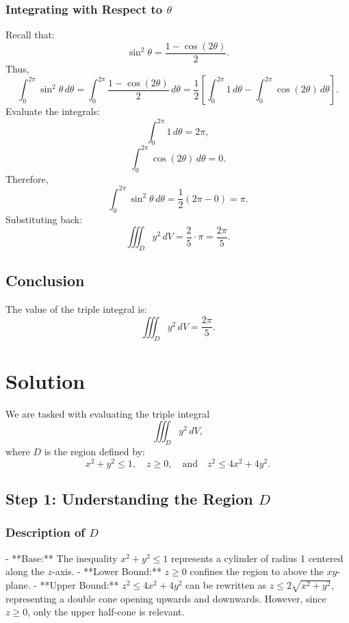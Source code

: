 \documentclass[11pt]{article}
\begin{document}
\subsubsection{Integrating with Respect to \( \theta \)}
Recall that:
\[
\sin^2\theta = \frac{1 - \cos(2\theta)}{2}.
\]
Thus,
\[
\int_{0}^{2\pi} \sin^2\theta \, d\theta = \int_{0}^{2\pi} \frac{1 - \cos(2\theta)}{2} \, d\theta = \frac{1}{2} \left[ \int_{0}^{2\pi} 1 \, d\theta - \int_{0}^{2\pi} \cos(2\theta) \, d\theta \right].
\]
Evaluate the integrals:
\[
\int_{0}^{2\pi} 1 \, d\theta = 2\pi,
\]
\[
\int_{0}^{2\pi} \cos(2\theta) \, d\theta = 0.
\]
Therefore,
\[
\int_{0}^{2\pi} \sin^2\theta \, d\theta = \frac{1}{2} (2\pi - 0) = \pi.
\]
Substituting back:
\[
\iiint_{D} y^2 \, dV = \frac{2}{5} \cdot \pi = \frac{2\pi}{5}.
\]

\subsection{Conclusion}

The value of the triple integral is:
\[
\iiint_{D} y^2 \, dV = \frac{2\pi}{5}.
\]




\newpage

\section{Solution}

We are tasked with evaluating the triple integral
\[
\iiint_{D} y^2 \, dV,
\]
where \( D \) is the region defined by:
\[
x^2 + y^2 \leq 1, \quad z \geq 0, \quad \text{and} \quad z^2 \leq 4x^2 + 4y^2.
\]

\newpage

\subsection{Step 1: Understanding the Region \( D \)}

\subsubsection{Description of \( D \)}
- **Base:** The inequality \( x^2 + y^2 \leq 1 \) represents a cylinder of radius 1 centered along the \( z \)-axis.
- **Lower Bound:** \( z \geq 0 \) confines the region to above the \( xy \)-plane.
- **Upper Bound:** \( z^2 \leq 4x^2 + 4y^2 \) can be rewritten as \( z \leq 2\sqrt{x^2 + y^2} \), representing a double cone opening upwards and downwards. However, since \( z \geq 0 \), only the upper half-cone is relevant.
\end{document}
